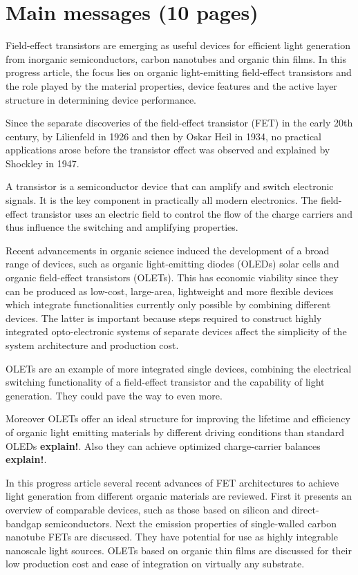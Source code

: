 \section{Main messages (10 pages)}

Field-effect transistors are emerging as useful devices for efficient light generation from inorganic semiconductors, carbon nanotubes and organic thin films. In this progress article, the focus lies on organic light-emitting field-effect transistors and the role played by the material properties, device features and the active layer structure in determining device performance.

Since the separate discoveries of the field-effect transistor (FET) in the early 20th century, by Lilienfeld in 1926 and then by Oskar Heil in 1934, no practical applications arose before the transistor effect was observed and explained by Shockley in 1947. %

A transistor is a semiconductor device that can amplify and switch electronic signals. It is the key component in practically all modern electronics. The field-effect transistor uses an electric field to control the flow of the charge carriers and thus influence the switching and amplifying properties.

Recent advancements in organic science induced the development of a broad range of devices, such as organic light-emitting diodes (OLEDs) solar cells and organic field-effect transistors (OLETs). This has economic viability since they can be produced as low-cost, large-area, lightweight and more flexible devices which integrate functionalities currently only possible by combining different devices. The latter is important because steps required to construct highly integrated opto-electronic systems of separate devices affect the simplicity of the system architecture and production cost.

OLETs are an example of more integrated single devices, combining the electrical switching functionality of a field-effect transistor and the capability of light generation. They could pave the way to even more. 

Moreover OLETs offer an ideal structure for improving the lifetime and efficiency of organic light emitting materials by different driving conditions than standard OLEDs \textbf{explain!}. Also they can achieve optimized charge-carrier balances \textbf{explain!}.

In this progress article several recent advances of FET architectures to achieve light generation from different organic materials are reviewed. First it presents an overview of comparable devices, such as those based on silicon and direct-bandgap semiconductors. Next the emission properties of single-walled carbon nanotube FETs are discussed. They have potential for use as highly integrable nanoscale light sources. OLETs based on organic thin films are discussed for their low production cost and ease of integration on virtually any substrate. 
